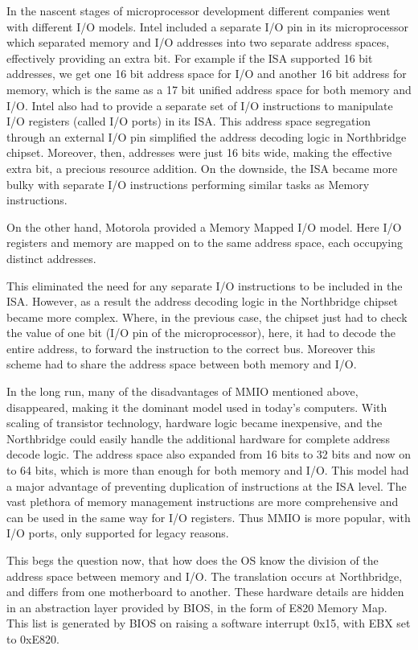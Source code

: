 In the nascent stages of microprocessor development different companies went with different I/O models. Intel included a separate I/O pin in its microprocessor which separated memory and I/O addresses into two separate address spaces, effectively providing an extra bit. For example if the ISA supported 16 bit addresses, we get one 16 bit address space for I/O and another 16 bit address for memory, which is the same as a 17 bit unified address space for both memory and I/O. Intel also had to provide a separate set of I/O instructions to manipulate I/O registers (called I/O ports) in its ISA. This address space segregation through an external I/O pin simplified the address decoding logic in Northbridge chipset. Moreover, then, addresses were just 16 bits wide, making the effective extra bit, a precious resource addition. On the downside, the ISA became more bulky with separate I/O instructions performing similar tasks as Memory instructions.

On the other hand, Motorola provided a Memory Mapped I/O model. Here I/O registers and memory are mapped on to the same address space, each occupying distinct addresses.

This eliminated the need for any separate I/O instructions to be included in the ISA. However, as a result the address decoding logic in the Northbridge chipset became more complex. Where, in the previous case, the chipset just had to check the value of one bit (I/O pin of the microprocessor), here, it had to decode the entire address, to forward the instruction to the correct bus. Moreover this scheme had to share the address space between both memory and I/O.

In the long run, many of the disadvantages of MMIO mentioned above, disappeared, making it the dominant model used in today's computers. With scaling of transistor technology, hardware logic became inexpensive, and the Northbridge could easily handle the additional hardware for complete address decode logic. The address space also expanded from 16 bits to 32 bits and now on to 64 bits, which is more than enough for both memory and I/O. This model had a major advantage of preventing duplication of instructions at the ISA level. The vast plethora of memory management instructions are more comprehensive and can be used in the same way for I/O registers. Thus MMIO is more popular, with I/O ports, only supported for legacy reasons. 

This begs the question now, that how does the OS know the division of the address space between memory and I/O. The translation occurs at Northbridge, and differs from one motherboard to another. These hardware details are hidden in an abstraction layer provided by BIOS, in the form of E820 Memory Map. This list is generated by BIOS on raising a software interrupt 0x15, with EBX set to 0xE820. 

